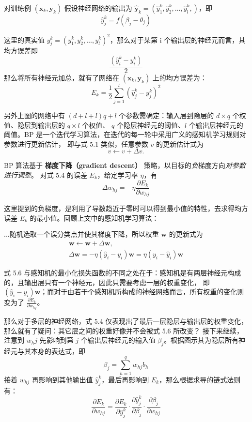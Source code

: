 \documentclass[../studies-ml.tex]{subfiles}
\begin{document}
对训练例 $(\pmb{x}_k, \pmb{y}_k)$ 假设神经网络的输出为 $\hat{\pmb{y}}_k = (\hat{y}_1^k,\hat{y}_2^k,\dots,\hat{y}_l^k,)$，即
\begin{equation}
  \hat{y}_j^k = f(\beta_j - \theta_j)
\end{equation}

这里的真实值 $y_j^k = (y_1^k,y_2^k,\dots,y_l^k)^2$，那么对于某第 i 个输出层的神经元而言，其均方误差即
\[
  \frac{(\hat{y}_i^k - y_i^k)}{2}
\]
那么将所有神经元加总，就有了网络在 $(\pmb{x}_k, \pmb{y}_k)$ 上的均方误差为：
\begin{equation}
  E_k = \frac{1}{2} \sum_{j=1}^{l} (\hat{y}_j^k - y_j^k)^2
\end{equation}

另外上图的网络中有 $(d + l + l) q + l$ 个参数需确定：输入层到隐层的 $d \times q$ 个权值、隐层到输出层的 $q \times l$ 个权值、
$q$ 个隐层神经元的阈值、$l$ 个输出层神经元的阈值。BP 是一个迭代学习算法，在迭代的每一轮中采用广义的感知机学习规则对参数进行更新估计，
即与式 5.1 类似，任意参数 $v$ 的更新估计式为
\begin{equation}
  v \leftarrow v + \Delta v.
\end{equation}

BP 算法基于 \textbf{梯度下降（gradient descent）} 策略，以目标的\textit{负}梯度方向\textit{对参数进行调整}。
对式 5.4 的误差 $E_k$，给定学习率 $\eta$，有
\begin{equation}
  \Delta w_{hj} = -\eta \frac{\partial E_k}{\partial w_{hj}}
\end{equation}

这里提到的负梯度，是利用了导数趋近于零时可以得到最小值的特性，去求得均方误差 $E_k$ 的最小值。回顾上文中的感知机学习算法：
\begin{aquote}
  ...随机选取一个误分类点并使其梯度下降，所以权重 $\pmb{w}$ 的更新式为
  \begin{gather*}
    \pmb{w} \leftarrow \pmb{w} + \Delta \pmb{w}, \\
    \Delta \pmb{w} = -\eta (\hat{y}_i - y_i) \pmb{w} = \eta (y_i - \hat{y}_i) \pmb{w}
  \end{gather*}
\end{aquote}

式 5.6 与感知机的最小化损失函数的不同之处在于：感知机是有两层神经元构成的，且输出层只有一个神经元，因此只需要考虑一层的权重变化，
即 $(\hat{y}_i - y_i) \pmb{w}$；而对于由若干个感知机所构成的神经网络而言，所有权重的变化则变为了
$\frac{\partial E_k}{\partial w_{hj}}$。

那么对于多层的神经网络，式 5.4 仅表现出了最后一层隐层与输出层的权重变化，那么就有了疑问：其它层之间的权重好像并不会被式 5.6 所改变？
接下来继续，注意到 $w_hj$ 先影响到第 $j$ 个输出层神经元的输入值 $\beta_j$。根据图示其为隐层所有神经元与其本身的表达式，即
\[ \beta_j = \sum_{h=1}^{q} w_{hj} b_h \]
接着 $w_{hj}$ 再影响到其他输出值 $\hat{y}_j^k$，最后再影响到 $E_k$，那么根据求导的链式法则有：
\begin{equation}
  \frac{\partial E_k}{\partial w_{hj}} =
  \frac{\partial E_k}{\partial \hat{y}_j^k} \cdot
  \frac{\partial \hat{y}_j^k}{\partial \beta_j} \cdot
  \frac{\partial \beta_j}{\partial w_{hj}}
\end{equation}
\end{document}
